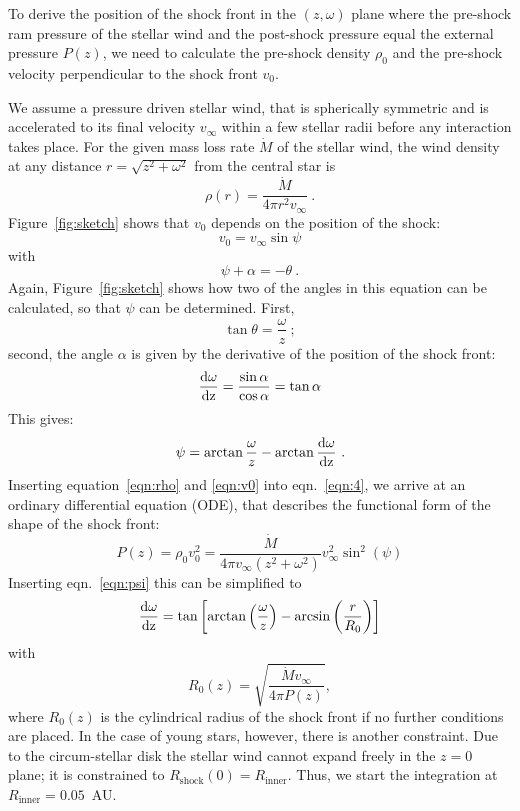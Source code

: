 To derive the position of the shock front in the $(z, \omega)$ plane where the pre-shock ram pressure of the stellar wind and the post-shock pressure equal the external pressure $P(z)$, we need to calculate the pre-shock density $\rho_0$ and the pre-shock velocity perpendicular to the shock front $v_0$.

We assume a pressure driven stellar wind, that is spherically symmetric and is accelerated to its final velocity $v_{\infty}$ within a few stellar radii before any interaction takes place. For the given mass loss rate $\dot M$ of the stellar wind, the wind density at any distance $r=\sqrt{z^2+\omega^2}$ from the central star is 
\begin{equation}\label{eqn:rho}
\rho(r) = \frac{\dot M}{4 \pi r^2 v_{\infty}}\ .
\end{equation}
Figure~\ref{fig:sketch} shows that $v_0$ depends on the position of the shock:
\begin{equation}
\label{eqn:v0}v_0 = v_{\infty} \sin \psi
\end{equation}
with 
\begin{equation}\label{eqn:angle}
\psi+\alpha = - \theta \ .
\end{equation}
Again, Figure~\ref{fig:sketch} shows how two of the angles in this equation can be calculated, so that $\psi$ can be determined. First,
\begin{equation}\label{eqn:theta}
\tan\theta = \frac{\omega}{z}\ ;
\end{equation}
second, the angle $\alpha$ is given by the derivative of the position of the shock front:
\begin{equation}\label{eqn:deriv}
\frac{\rm{d}\omega}{\rm{d}z} = \frac{\sin \alpha}{\cos \alpha} = \tan{\alpha}
\end{equation}
This gives:
\begin{equation}\label{eqn:psi}
\psi = \arctan{\frac{\omega}{z}} - \arctan{\frac{\rm{d}\omega}{\rm{d}z}}\ .
\end{equation}
Inserting equation~\ref{eqn:rho} and \ref{eqn:v0} into eqn.~\ref{eqn:4}, we arrive at an ordinary differential equation (ODE), that describes the functional form of the shape of the shock front:
\begin{equation}
P(z) = \rho_0v_0^2 = \frac{\dot{M}}{4\pi v_{\infty}(z^2+\omega^2)} v_{\infty}^2 \sin^2(\psi)
\end{equation}
Inserting eqn.~\ref{eqn:psi} this can be simplified to
\begin{equation}\label{eqn:ode}
\frac{\rm{d}\omega}{\rm{d}z} = \tan\left[\arctan\left(\frac{\omega}{z}\right)-\arcsin\left(\frac{r}{R_0}\right)\right]
\end{equation}
with
\begin{equation}
R_0(z) = \sqrt{\frac{\dot{M} v_{\infty}}{4\pi P(z)}},
\end{equation}
where $R_0(z)$ is the cylindrical radius of the shock front if no further conditions are placed. In the case of young stars, however, there is another constraint. Due to the circum-stellar disk the stellar wind cannot expand freely in the $z=0$ plane; it is constrained to $R_{\textrm{shock}}(0) = R_{\textrm{inner}}$. Thus, we start the integration at $R_{\textrm{inner}} = 0.05$~AU.

